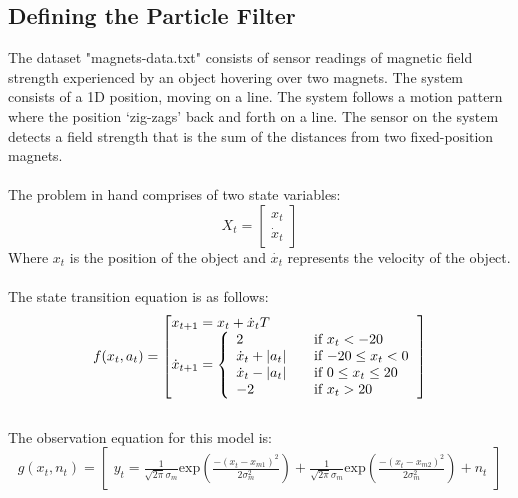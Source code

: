 \documentclass[12pt]{article}
\begin{document}
\subsection{Defining the Particle Filter}
The dataset "magnets-data.txt" consists of sensor readings of magnetic field strength experienced by an object hovering over two magnets. The system consists of a 1D position, moving on a line. The system follows a motion pattern where the position `zig-zags' back and forth on a line. The sensor on the system detects a field strength that is the sum of the distances from two fixed-position magnets.\\
\\ 
The problem in hand comprises of two state variables:
\begin{equation}
X_t = \begin{bmatrix}
x_t \\
\dot{x}_t
\end{bmatrix}
\label{eq:States}
\end{equation}
Where $x_t$ is the position of the object and $\dot{x_t}$ represents the velocity of the object.\\ 
\\ 
The state transition equation is as follows:
\begin{equation}
f(x_t,a_t) = \begin{bmatrix*}[l]
x_{t+1} = x_t + \dot{x}_t T \\
\dot{x}_{t+1} = \left\{
\begin{array}{l l}
  2 & \quad \text{if $x_t < -20$} \\
  \dot{x}_t + |a_t| & \quad \text{if $-20 \le x_t < 0$} \\
  \dot{x}_t - |a_t| & \quad \text{if $0 \le x_t \le 20$} \\
  -2 & \quad \text{if $x_t > 20$} \\
\end{array} \right.
\end{bmatrix*}
\label{eq:ST}
\end{equation}
\\ 
The observation equation for this model is:
\begin{equation}
g(x_t,n_t) = \begin{bmatrix}
y_t = \frac{1}{\sqrt{2 \pi} \sigma_m}
\mathrm{exp} ( \frac{-(x_t - x_{m1})^2}{2 \sigma_m^2} ) +
\frac{1}{\sqrt{2 \pi} \sigma_m}
\mathrm{exp} ( \frac{-(x_t - x_{m2})^2}{2 \sigma_m^2} ) + n_t
\end{bmatrix}
\label{eq:obs}
\end{equation}
\end{document}
